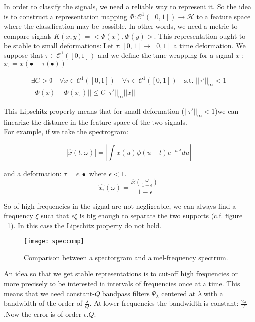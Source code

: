 \documentclass[onecolumn,12pt]{article}
\begin{document}
	In order to classify the signals, we need a reliable way to represent it. So the idea is to construct a representation mapping $\Phi: \mathscr{C}^1([0,1]) \rightarrow \mathscr{H}$ to a feature space where the classification may be possible. In other words, we need a metric to compare signals $K(x,y)=<\Phi(x),\Phi(y)>$. This representation ought to be stable to small deformations: Let $\tau:[0,1] \rightarrow [0,1]$ a time deformation. We suppose that $\tau \in  \mathscr{C}^1([0,1]) $ and we define the time-wrapping for a signal $x$ : $x_{\tau}=x(\bullet- \tau(\bullet) )$
	
	\begin{equation}
	\begin{split}
		\exists C>0 \quad \forall x \in \mathscr{C}^1([0,1]) \quad  \forall \tau \in \mathscr{C}^1([0,1])  \quad \text{s.t. \ } ||\tau'||_{\infty}<1 \\
				 ||\Phi(x)-\Phi(x_{\tau})||\leq C ||\tau'||_{\infty} || x||
	\end{split}
	\end{equation}
	
	This Lipschitz property means that for small deformation ($||\tau'||_{\infty}<1 $)we can linearize the distance in the feature space of the two signals.\\
	
	For example, if we take the spectrogram:
	
	\begin{equation}
		|\hat{x}(t,\omega)|=|\int x(u) \phi(u-t) e^{-i\omega t} du|
	\end{equation}
	
	and a deformation: $\tau=\epsilon . \bullet $ where $\epsilon<1$. $$\hat{x_{\tau}}(\omega)=\frac{\hat{x}(\frac{\omega}{1-\epsilon})}{1-\epsilon}$$
	
	So of high frequencies in the signal are not negligeable, we can always find a frequency $\xi$ such that $\epsilon \xi$ is big enough to separate the two supports (c.f. figure ~\ref{fig:speccomp}). In this case the Lipschitz property do not hold. 
	
	\begin{figure}
		\centering
		\texttt{[image: speccomp]}
		\caption{\label{fig:speccomp} Comparison between a spectorgram and a mel-frequency spectrum.}
	\end{figure}
	
	An idea so that we get stable representations is to cut-off high frequencies or more precisely to be interested in intervals of frequencies once at a time. This means that we need constant-$Q$ bandpass filters $\Psi_{\lambda}$ centered at $\lambda$ with a bandwidth of the order of $\frac{\lambda}{Q}$. At lower frequencies the bandwidth is constant: $\frac{2\pi }{T}$.Now the error is of order $\epsilon . Q$:
	
\end{document}
